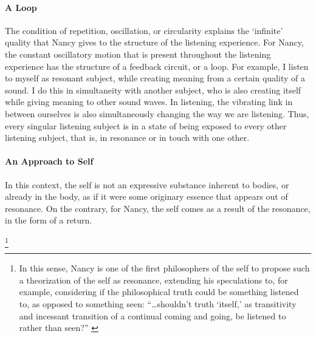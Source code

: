 \paragraph{A Loop}
The condition of repetition, oscillation, or circularity explains the `infinite' quality that Nancy gives to the structure of the listening experience. For Nancy, the constant oscillatory motion that is present throughout the listening experience has the structure of a feedback circuit, or a loop. For example, I listen to myself as resonant subject, while creating meaning from a certain quality of a sound. I do this in simultaneity with another subject, who is also creating itself while giving meaning to other sound waves. In listening, the vibrating link in between ourselves is also simultaneously changing the way we are listening. Thus, every singular listening subject is in a state of being exposed to every other listening subject, that is, in resonance or in touch with one other. 

\paragraph{An Approach to Self}

In this context, the self is not an expressive substance inherent to bodies, or already in the body, as if it were some originary essence that appears out of resonance. On the contrary, for Nancy, the self comes as a result of the resonance, in the form of a return. 






\footnote{In this sense, Nancy is one of the first philosophers of the self to propose such a theorization of the self as resonance, extending his speculations to, for example, considering if the philosophical truth could be something listened to, as opposed to something seen: ``\dots shouldn't truth `itself,' as transitivity and incessant transition of a continual coming and going, be listened to rather than seen?'' \parencite[4]{Nan07:Lis}}









